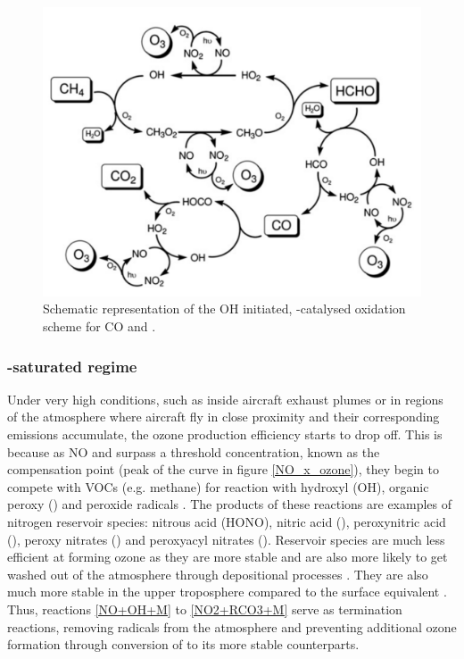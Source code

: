 \begin{figure}[H]
  \centering
  \includegraphics[width=0.65\linewidth]{NOx-O3-CO-CH4.png}
  \caption{Schematic representation of the OH initiated, -catalysed oxidation scheme for CO and  \cite{Jenkin2008}.}
  \label{NOx-O3-CO-CH4}
\end{figure}




\subsubsection{-saturated regime}
Under very high  conditions, such as inside aircraft exhaust plumes or in regions of the atmosphere where aircraft fly in close proximity and their corresponding emissions accumulate, the ozone production efficiency starts to drop off. This is because as NO and  surpass a threshold concentration, known as the compensation point (peak of the curve in figure \ref{NO_x_ozone}), they begin to compete with VOCs (e.g. methane) for reaction with hydroxyl (OH), organic peroxy () and peroxide  radicals \cite{Wasiuk2014}. The products of these reactions are examples of nitrogen reservoir species: nitrous acid (HONO), nitric acid (), peroxynitric acid (), peroxy nitrates () and peroxyacyl nitrates (). Reservoir species are much less efficient at forming ozone as they are more stable and are also more likely to get washed out of the atmosphere through depositional processes \cite{Jenkin2000}. They are also much more stable in the upper troposphere compared to the surface equivalent \cite{Khan2020}. Thus, reactions \eqref{NO+OH+M} to \eqref{NO2+RCO3+M} serve as termination reactions, removing radicals from the atmosphere and preventing additional ozone formation through conversion of  to its more stable counterparts.

